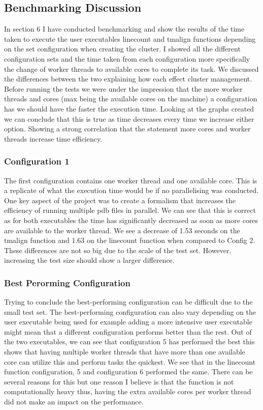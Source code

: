 \documentclass[]{final_report}
\begin{document}
\subsection{Benchmarking Discussion}
In section 6 I have conducted benchmarking and show the results of the time taken to execute the user executables linecount and tmalign functions depending on the set configuration when creating the cluster. I showed all the different configuration sets and the time taken from each configuration more specifically the change of worker threads to available cores to complete its task. We discussed the differences between the two explaining how each effect cluster management. Before running the tests we were under the impression that the more worker threads and cores (max being the available cores on the machine) a configuration has we should have the faster the execution time. Looking at the graphs created we can conclude that this is true as time decreases every time we increase either option. Showing a strong correlation that the statement more cores and worker threads increase time efficiency.

\subsubsection{Configuration 1}
The first configuration contains one worker thread and one available core. This is a replicate of what the execution time would be if no parallelising was conducted. One key aspect of the project was to create a formalism that increases the efficiency of running multiple pdb files in parallel. We can see that this is correct as for both executables the time has significantly decreased as soon as more cores are available to the worker thread. We see a decrease of 1.53 seconds on the tmalign function and 1.63 on the linecount function when compared to Config 2. These differences are not so big due to the scale of the test set. However, increasing the test size should show a larger difference.

\subsubsection{Best Perorming Configuration}

Trying to conclude the best-performing configuration can be difficult due to the small test set. The best-performing configuration can also vary depending on the user executable being used for example adding a more intensive user executable might mean that a different configuration performs better than the rest. Out of the two executables, we can see that configuration 5 has performed the best this shows that having multiple worker threads that have more than one available core can utilize this and perform tasks the quickest. We see that in the linecount function configuration, 5 and configuration 6 performed the same. There can be several reasons for this but one reason I believe is that the function is not computationally heavy thus, having the extra available cores per worker thread did not make an impact on the performance.
\end{document}
